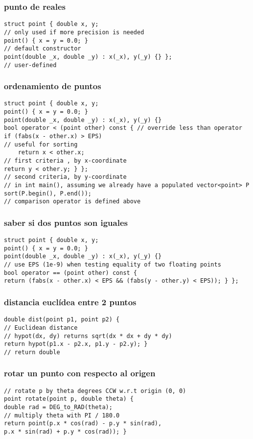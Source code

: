 \documentclass[11pt,a4paper]{book}
\begin{document}
\subsubsection{punto de reales}
\begin{lstlisting}[style=C]
struct point { double x, y;
// only used if more precision is needed
point() { x = y = 0.0; }
// default constructor
point(double _x, double _y) : x(_x), y(_y) {} };
// user-defined
\end{lstlisting}
\subsubsection{ordenamiento de puntos}
\begin{lstlisting}[style=C]
struct point { double x, y;
point() { x = y = 0.0; }
point(double _x, double _y) : x(_x), y(_y) {}
bool operator < (point other) const { // override less than operator
if (fabs(x - other.x) > EPS)
// useful for sorting
	return x < other.x;
// first criteria , by x-coordinate
return y < other.y; } };
// second criteria, by y-coordinate
// in int main(), assuming we already have a populated vector<point> P
sort(P.begin(), P.end());
// comparison operator is defined above
\end{lstlisting}
\subsubsection{saber si dos puntos son iguales}
\begin{lstlisting}[style=C]
struct point { double x, y;
point() { x = y = 0.0; }
point(double _x, double _y) : x(_x), y(_y) {}
// use EPS (1e-9) when testing equality of two floating points
bool operator == (point other) const {
return (fabs(x - other.x) < EPS && (fabs(y - other.y) < EPS)); } };
\end{lstlisting}
\subsubsection{distancia euclídea entre 2 puntos}
\begin{lstlisting}[style=C]
double dist(point p1, point p2) {
// Euclidean distance
// hypot(dx, dy) returns sqrt(dx * dx + dy * dy)
return hypot(p1.x - p2.x, p1.y - p2.y); }
// return double
\end{lstlisting}
\subsubsection{rotar un punto con respecto al origen}
\begin{lstlisting}[style=C]
// rotate p by theta degrees CCW w.r.t origin (0, 0)
point rotate(point p, double theta) {
double rad = DEG_to_RAD(theta);
// multiply theta with PI / 180.0
return point(p.x * cos(rad) - p.y * sin(rad),
p.x * sin(rad) + p.y * cos(rad)); }
\end{lstlisting}
\end{document}
